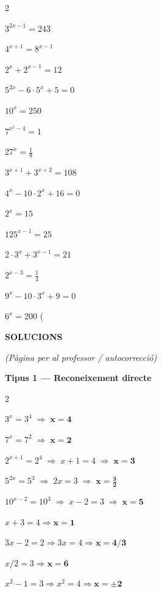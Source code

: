 \documentclass[12pt,a4paper]{article}
\begin{document}
\begin{multicols}{2}
\begin{exercicis}
    \item $3^{2x-1} = 243$
    \item $4^{x+1} = 8^{x-1}$
    \item $2^x + 2^{x-1} = 12$
    \item $5^{2x} - 6 \cdot 5^x + 5 = 0$
    \item $10^x = 250$ 
    \item $7^{x^2-4} = 1$
    \item $27^x = \frac{1}{9}$
    \item $3^{x+1} + 3^{x+2} = 108$
    \item $4^x - 10 \cdot 2^x + 16 = 0$
    \item $2^x = 15$ 
    \item $125^{x-1} = 25$
    \item $2 \cdot 3^x + 3^{x-1} = 21$
    \item $2^{x-3} = \frac{1}{4}$
    \item $9^x - 10 \cdot 3^x + 9 = 0$
    \item $6^x = 200$ (
\end{exercicis}
\end{multicols}
\newpage
\begin{center}
    {\Large \textbf{SOLUCIONS}}
\end{center}
\begin{center}
    \textit{(Pàgina per al professor / autocorrecció)}
\end{center}
\vspace{0.4cm}

\noindent\textbf{Tipus 1 --- Reconeixement directe}

\begin{multicols}{2}
\begin{exercicis}
    \item $3^x = 3^4 \;\Rightarrow\; \boldsymbol{x=4}$
    \item $7^x = 7^2 \;\Rightarrow\; \boldsymbol{x=2}$
    \item $2^{x+1} = 2^4 \;\Rightarrow\; x+1=4 \;\Rightarrow\; \boldsymbol{x=3}$
    \item $5^{2x} = 5^3 \;\Rightarrow\; 2x=3 \;\Rightarrow\; \boldsymbol{x=\tfrac{3}{2}}$
    \item $10^{x-2} = 10^3 \;\Rightarrow\; x-2=3 \;\Rightarrow\; \boldsymbol{x=5}$
    \item $x+3=4 \Rightarrow \boldsymbol{x=1}$
    \item $3x-2=2 \Rightarrow 3x=4 \Rightarrow \boldsymbol{x=4/3}$
    \item $x/2=3 \Rightarrow \boldsymbol{x=6}$
    \item $x^2-1=3 \Rightarrow x^2=4 \Rightarrow \boldsymbol{x=\pm 2}$
\end{exercicis}
\end{multicols}
\end{document}
